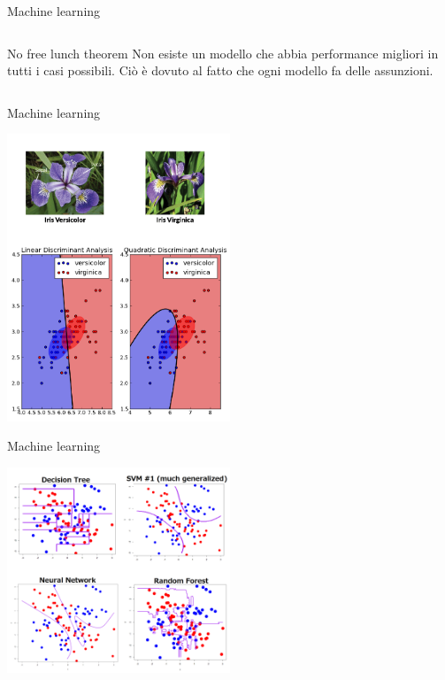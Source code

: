 \documentclass[11pt]{beamer}
\begin{document}
\begin{frame}{Machine learning \cite{pml1Book,pml2Book,classification,regression}}
\begin{columns}
\begin{column}{0.4\textwidth}
\begin{center}
\end{center}
\begin{alertblock}{No free lunch theorem}
Non esiste un modello che abbia performance migliori in tutti i casi possibili. Ciò è dovuto al fatto che ogni modello fa delle assunzioni.
\end{alertblock}
\end{column}
\end{columns}
\end{frame}

\begin{frame}{Machine learning \cite{pml1Book,pml2Book,classification,regression,bd}}

\begin{center}
\includegraphics[width=0.5\textwidth]{Pic/decision_boundary_example.png}
\end{center}


\end{frame}



\begin{frame}{Machine learning \cite{pml1Book,pml2Book,classification,regression,KirkDBorne}}

\begin{center}
\includegraphics[width=0.5\textwidth]{Pic/ML_dec_boundary.png}
\end{center}


\end{frame}
\end{document}

